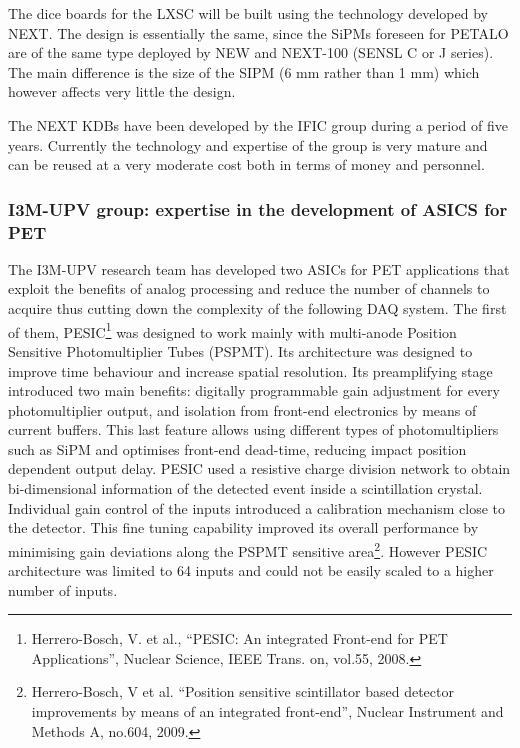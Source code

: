The dice boards for the LXSC will be built using the technology developed by NEXT. The design is essentially the same, since the SiPMs foreseen for PETALO are of the same type deployed by NEW and NEXT-100 (SENSL C or J series). The main difference is the size of the SIPM (6 mm rather than 1 mm) which however affects very little the design. 

The NEXT KDBs have been developed by the IFIC group during a period of five years. Currently the technology and expertise of the group is very mature and can be reused at a very moderate cost both in terms of money and personnel. 


\subsubsection*{I3M-UPV group: expertise in the development of ASICS for PET}

The I3M-UPV research team has developed two ASICs for PET applications that
exploit the benefits of analog processing and reduce the number of channels
to acquire thus cutting down the complexity of the following DAQ system. 
The first of them, PESIC\footnote{Herrero-Bosch, V. et al., 
``PESIC: An integrated Front-end for PET
Applications'', Nuclear Science, IEEE Trans. on, vol.55, 2008.} was designed to work mainly with multi-anode
Position Sensitive Photomultiplier Tubes (PSPMT). Its architecture was
designed to improve time behaviour and increase spatial resolution. Its
preamplifying stage introduced two main benefits: digitally programmable gain
adjustment for every photomultiplier output, and isolation from front-end
electronics by means of current buffers. This last feature allows using
different types of photomultipliers such as SiPM and optimises front-end
dead-time, reducing impact position dependent output delay. PESIC used a
resistive charge division network to obtain bi-dimensional information of the
detected event inside a scintillation crystal.  Individual gain control of
the inputs introduced a calibration mechanism close to the detector. This
fine tuning capability improved its overall performance by minimising gain
deviations along the PSPMT sensitive area\footnote{Herrero-Bosch, V et al. ``Position sensitive scintillator based detector
improvements by means of an integrated front-end'', Nuclear Instrument and Methods
A, no.604, 2009.}. However PESIC architecture
was limited to 64 inputs and could not be easily scaled to a higher number
of inputs.

